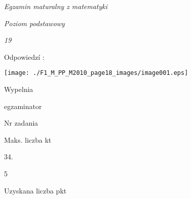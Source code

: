 \documentclass[a4paper,12pt]{article}
\begin{document}
{\it Egzamin maturalny z matematyki}

{\it Poziom podstawowy}

{\it 19}

Odpowiedzí :
\begin{center}
\texttt{[image: ./F1\_M\_PP\_M2010\_page18\_images/image001.eps]}
\end{center}
Wypelnia

egzaminator

Nr zadania

Maks. liczba kt

34.

5

Uzyskana liczba pkt
\end{document}
